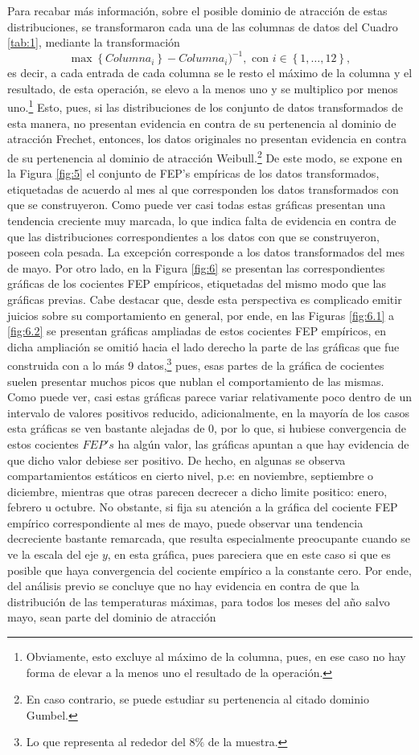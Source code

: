 \documentclass[10.5pt,notitlepage]{article}
\newcommand{\kis}[1]{\left\{ #1 \right\}}
\theoremstyle{plain}
\begin{document}
Para recabar más información, sobre el posible dominio de atracción de estas distribuciones, se transformaron cada una de las columnas de datos del Cuadro \ref{tab:1}, mediante la transformación
\[
\max\kis{Columna_i} -  Columna_{i})^{-1}, \text{ con } i \in \kis{1, \hdots, 12},
\]
es decir, a cada entrada de cada columna se le resto el máximo de la columna y el resultado, de esta operación, se elevo a la menos uno y se multiplico por menos uno.\footnote{Obviamente, esto excluye al máximo de la columna, pues, en ese caso no hay forma de elevar a la menos uno el resultado de la operación.} Esto, pues, si las distribuciones de los conjunto de datos transformados de esta manera, no presentan evidencia en contra de su pertenencia al dominio de atracción Frechet, entonces, los datos originales no presentan evidencia en contra de su pertenencia al dominio de atracción Weibull.\footnote{En caso contrario, se puede estudiar su pertenencia al citado dominio Gumbel.} De este modo, se expone en la Figura \ref{fig:5} el conjunto de FEP's empíricas de los datos transformados, etiquetadas de acuerdo al mes al que corresponden los datos transformados con que se construyeron. Como puede ver casi todas estas gráficas presentan una tendencia creciente muy marcada, lo que indica falta de evidencia en contra de que las distribuciones correspondientes a los datos con que se construyeron, poseen cola pesada. La excepción corresponde a los datos transformados del mes de mayo. Por otro lado, en la Figura \ref{fig:6} se presentan las correspondientes gráficas de los cocientes FEP empíricos, etiquetadas del mismo modo que las gráficas previas. Cabe destacar que, desde esta perspectiva es complicado emitir juicios sobre su comportamiento en general, por ende, en las Figuras \ref{fig:6.1} a \ref{fig:6.2} se presentan gráficas ampliadas de estos cocientes FEP empíricos, en dicha ampliación se omitió hacia el lado derecho la parte de las gráficas que fue construida con a lo más 9 datos,\footnote{Lo que representa al rededor del \(8 \%\) de la muestra.} pues, esas partes de la gráfica de cocientes suelen presentar muchos picos que nublan el comportamiento de las mismas. Como puede ver, casi estas gráficas parece variar relativamente poco dentro de un intervalo de valores positivos reducido, adicionalmente, en la mayoría de los casos esta gráficas se ven bastante alejadas de \(0\), por lo que, si hubiese convergencia de estos cocientes \(FEP's\) ha algún valor, las gráficas apuntan a que hay evidencia de que dicho valor debiese ser positivo. De hecho, en algunas se observa compartamientos estáticos en cierto nivel, p.e: en noviembre, septiembre o diciembre, mientras que otras parecen decrecer a dicho limite positico: enero, febrero u octubre. No obstante, si fija su atención a la gráfica del cociente FEP empírico correspondiente al mes de mayo, puede observar una tendencia decreciente bastante remarcada, que resulta especialmente preocupante cuando se ve la escala del eje \(y\), en esta gráfica, pues pareciera que en este caso si que es posible que haya convergencia del cociente empírico a la constante cero. Por ende, del análisis previo se concluye que no hay evidencia en contra de que la distribución de las temperaturas máximas, para todos los meses del año salvo mayo, sean parte del dominio de atracción 
\end{document}

